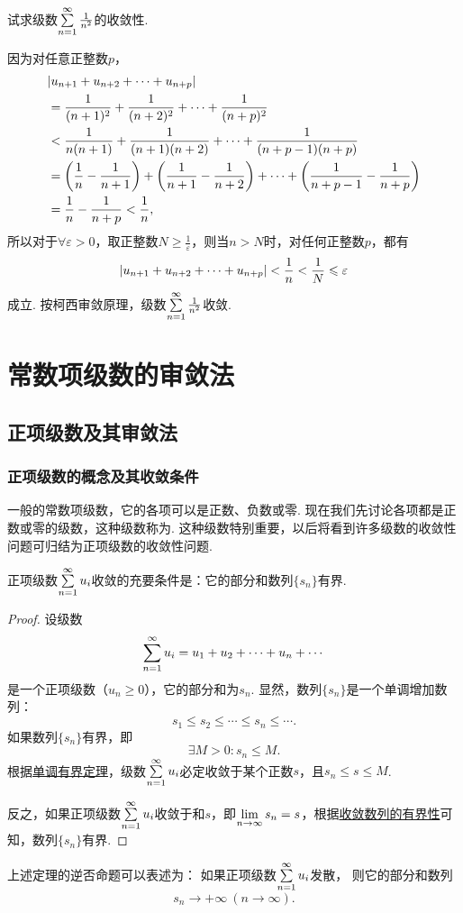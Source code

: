 \begin{example}
试求级数\(\sum\limits_{n=1}^\infty \frac{1}{n^2}\)的收敛性.
\begin{solution}
因为对任意正整数\(p\)，\begin{align*}
&\abs{u_{n+1}+u_{n+2}+\dotsb+u_{n+p}} \\
&=\frac{1}{(n+1)^2}+\frac{1}{(n+2)^2}+\dotsb+\frac{1}{(n+p)^2} \\
&<\frac{1}{n(n+1)}+\frac{1}{(n+1)(n+2)}+\dotsb+\frac{1}{(n+p-1)(n+p)} \\
&=\left(\frac{1}{n}-\frac{1}{n+1}\right)+\left(\frac{1}{n+1}-\frac{1}{n+2}\right)+\dotsb+\left(\frac{1}{n+p-1}-\frac{1}{n+p}\right) \\
&=\frac{1}{n}-\frac{1}{n+p} < \frac{1}{n},
\end{align*}
所以对于\(\forall \varepsilon > 0\)，取正整数\(N \geqslant \frac{1}{\varepsilon}\)，则当\(n > N\)时，对任何正整数\(p\)，都有\[
\abs{u_{n+1}+u_{n+2}+\dotsb+u_{n+p}}
< \frac{1}{n}
< \frac{1}{N}
\leqslant \varepsilon
\]成立.
按柯西审敛原理，级数\(\sum\limits_{n=1}^\infty \frac{1}{n^2}\)收敛.
\end{solution}
\end{example}

\section{常数项级数的审敛法}
\subsection{正项级数及其审敛法}
\subsubsection{正项级数的概念及其收敛条件}
一般的常数项级数，它的各项可以是正数、负数或零.
现在我们先讨论各项都是正数或零的级数，这种级数称为.
这种级数特别重要，以后将看到许多级数的收敛性问题可归结为正项级数的收敛性问题.

\begin{theorem}\label{theorem:无穷级数.正项级数收敛的充要条件}
正项级数\(\sum\limits_{n=1}^\infty u_i\)收敛的充要条件是：它的部分和数列\(\{s_n\}\)有界.
\begin{proof}
设级数\[
\sum\limits_{n=1}^\infty u_i = u_1 + u_2 + \dotsb + u_n + \dotsb
\]是一个正项级数（\(u_n \geqslant 0\)），它的部分和为\(s_n\).
显然，数列\(\{s_n\}\)是一个单调增加数列：\[
s_1 \leqslant s_2 \leqslant \dotsb \leqslant s_n \leqslant \dotsb.
\]如果数列\(\{s_n\}\)有界，即\[
\exists M>0 : s_n \leqslant M.
\]根据\hyperref[theorem:极限.数列的单调有界定理]{单调有界定理}，级数\(\sum\limits_{n=1}^\infty u_i\)必定收敛于某个正数\(s\)，且\(s_n \leqslant s \leqslant M\).

反之，如果正项级数\(\sum\limits_{n=1}^\infty u_i\)收敛于和\(s\)，即\(\lim\limits_{n\to\infty} s_n = s\)，根据\hyperref[theorem:极限.收敛数列的有界性]{收敛数列的有界性}可知，数列\(\{s_n\}\)有界.
\end{proof}
\end{theorem}
上述定理的逆否命题可以表述为：
如果正项级数\(\sum\limits_{n=1}^\infty u_i\)发散，%
则它的部分和数列
\[
s_n \to +\infty\ (n\to\infty).
\]

